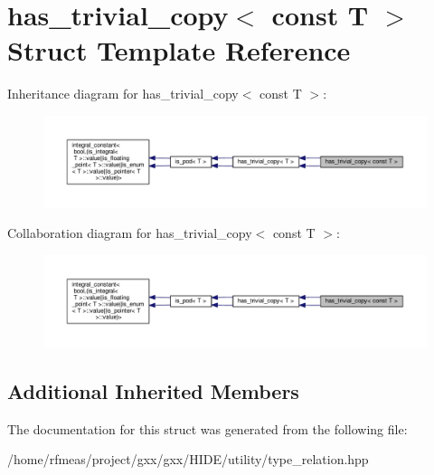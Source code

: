 \hypertarget{structhas__trivial__copy_3_01const_01T_01_4}{}\section{has\+\_\+trivial\+\_\+copy$<$ const T $>$ Struct Template Reference}
\label{structhas__trivial__copy_3_01const_01T_01_4}


Inheritance diagram for has\+\_\+trivial\+\_\+copy$<$ const T $>$\+:
\nopagebreak
\begin{figure}[H]
\begin{center}
\leavevmode
\includegraphics[width=350pt]{structhas__trivial__copy_3_01const_01T_01_4__inherit__graph}
\end{center}
\end{figure}


Collaboration diagram for has\+\_\+trivial\+\_\+copy$<$ const T $>$\+:
\nopagebreak
\begin{figure}[H]
\begin{center}
\leavevmode
\includegraphics[width=350pt]{structhas__trivial__copy_3_01const_01T_01_4__coll__graph}
\end{center}
\end{figure}
\subsection*{Additional Inherited Members}


The documentation for this struct was generated from the following file\+:\begin{DoxyCompactItemize}
\item 
/home/rfmeas/project/gxx/gxx/\+H\+I\+D\+E/utility/type\+\_\+relation.\+hpp\end{DoxyCompactItemize}
